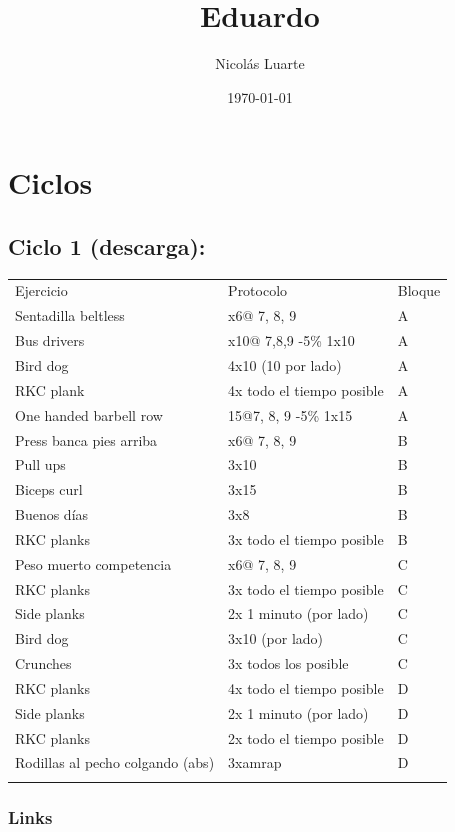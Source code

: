 \documentclass[11pt]{article}
\author{Nicolás Luarte}
\date{\today}
\title{Eduardo}
\begin{document}
\maketitle
\tableofcontents

\section{Ciclos}
\label{sec:org898bb05}
\subsection{Ciclo 1 (descarga):}
\label{sec:org150445f}
\begin{center}
\begin{tabular}{lll}
Ejercicio & Protocolo & Bloque\\
Sentadilla beltless & x6@ 7, 8, 9 & A\\
Bus drivers & x10@ 7,8,9 -5\% 1x10 & A\\
Bird dog & 4x10 (10 por lado) & A\\
RKC plank & 4x todo el tiempo posible & A\\
One handed barbell row & 15@7, 8, 9 -5\% 1x15 & A\\
\hline
Press banca pies arriba & x6@ 7, 8, 9 & B\\
Pull ups & 3x10 & B\\
Biceps curl & 3x15 & B\\
Buenos días & 3x8 & B\\
RKC planks & 3x todo el tiempo posible & B\\
\hline
Peso muerto competencia & x6@ 7, 8, 9 & C\\
RKC planks & 3x todo el tiempo posible & C\\
Side planks & 2x 1 minuto (por lado) & C\\
Bird dog & 3x10 (por lado) & C\\
Crunches & 3x todos los posible & C\\
\hline
RKC planks & 4x todo el tiempo posible & D\\
Side planks & 2x 1 minuto (por lado) & D\\
RKC planks & 2x todo el tiempo posible & D\\
Rodillas al pecho colgando (abs) & 3xamrap & D\\
 &  & \\
\end{tabular}
\end{center}

\subsubsection{Links}
\label{sec:org705dd3b}
\end{document}
